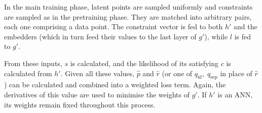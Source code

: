 \documentclass[../../main.tex]{subfiles}
\begin{document}
In the main training phase, latent points are sampled uniformly and constraints are sampled as in the pretraining phase.
They are matched into arbitrary pairs, each one comprising a data point.
The constraint vector is fed to both $h'$ and the embedders (which in turn feed their values to the last layer of $g'$), while $l$ is fed to $g'$.

From these inputs, $s$ is calculated, and the likelihood of its satisfying $c$ is calculated from $h'$.
Given all these values, $\hat{p}$ and $\hat{r}$ (or one of $q_\text{id},\;q_\text{sep}$ in place of $\hat{r}$) can be calculated and combined into a weighted loss term.
Again, the derivatives of this value are used to minimise the weights of $g'$.
If $h'$ is an ANN, its weights remain fixed throughout this process.
\end{document}
